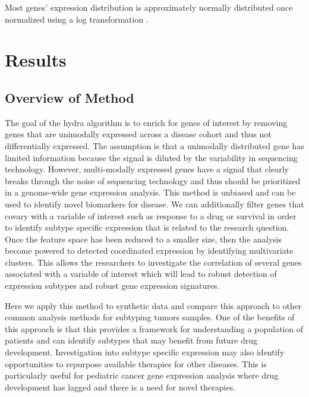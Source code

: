 \documentclass[fleqn,10pt]{wlscirep}
\begin{document}
Most genes' expression distribution is approximately normally distributed once normalized using a log transformation \cite{zwiener2014transforming}. 


\section*{Results}
\subsection*{Overview of Method}
The goal of the hydra algorithm is to enrich for genes of interest by removing genes that are unimodally expressed across a disease cohort and thus not differentially expressed. The assumption is that a unimodally distributed gene has limited information because the signal is diluted by the variability in sequencing technology. However, multi-modally expressed genes have a signal that clearly breaks through the noise of sequencing technology and thus should be prioritized in a genome-wide gene expression analysis. This method is unbiased and can be used to identify novel biomarkers for disease. We can additionally filter genes that covary with a variable of interest such as response to a drug or survival in order to identify subtype specific expression that is related to the research question. Once the feature space has been reduced to a smaller size, then the analysis become powered to detected coordinated expression by identifying multivariate clusters. This allows the researchers to investigate the correlation of several genes associated with a variable of interest which will lead to robust detection of expression subtypes and robust gene expression signatures.

Here we apply this method to synthetic data and compare this approach to other common analysis methods for subtyping tumors samples. One of the benefits of this approach is that this provides a framework for understanding a population of patients and can identify subtypes that may benefit from future drug development. Investigation into subtype specific expression may also identify opportunities to repurpose available therapies for other diseases. This is particularly useful for pediatric cancer gene expression analysis where drug development has lagged and there is a need for novel therapies. 

\end{document}
